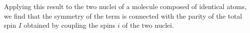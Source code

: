 Applying this result to the two nuclei of a molecule composed of identical atoms, we find that the symmetry of the term is connected with the parity of the total spin $I$ obtained by coupling the spins $i$ of the two nuclei.
